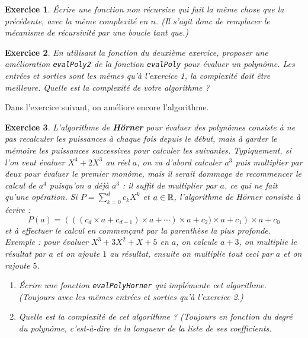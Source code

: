 \documentclass[11pt,a4paper]{article}
\newtheorem{ex}{Exercice}
\begin{document}
\begin{ex}
Écrire une fonction non récursive qui fait la même chose que la précédente, avec la même complexité en $n$. 
(Il s'agit donc de remplacer le mécanisme de récursivité par une boucle \og tant que\fg.)

\end{ex}

\begin{ex}
En utilisant la fonction du deuxième exercice, proposer une amélioration \verb+evalPoly2+ de la fonction \verb+evalPoly+ pour évaluer un polynôme.
Les entrées et sorties sont les mêmes qu'à l'exercice 1, la complexité doit être meilleure.
Quelle est la complexité de votre algorithme ?
\end{ex}

Dans l'exercice suivant, on améliore encore l'algorithme.

\begin{ex}
L'algorithme de \textbf{Hörner} pour évaluer des polynômes consiste à ne pas recalculer les puissances à chaque fois depuis le début, mais à garder le mémoire les puissances successives pour calculer les suivantes. 
Typiquement, si l'on veut évaluer $X^4+2X^3$ au réel $a$, on va d'abord calculer $a^3$ puis multiplier par deux pour évaluer le premier monôme, mais il serait dommage de recommencer le calcul de $a^4$ puisqu'on a déjà $a^3$ : il suffit de multiplier par $a$, ce qui ne fait qu'une opération.
Si $P = \sum_{k=0}^d c_kX^k$ et $a\in\mathbb{R}$, l'algorithme de Hörner consiste à écrire :
\[ P(a) = \left(((c_d\times a+c_{d-1})\times a +\cdots )\times a +c_2)\times a+c_1 \right)\times a+c_0\]
et à effectuer le calcul en commençant par la parenthèse la plus \og profonde\fg.
Exemple : pour évaluer $X^3+3X^2+X+5$ en $a$, on calcule $a+3$, on multiplie le résultat par $a$ et on ajoute $1$ au résultat, ensuite on multiplie tout ceci par $a$ et on rajoute $5$.

\begin{enumerate}
\item Écrire une fonction \verb+evalPolyHorner+ qui implémente cet algorithme. (Toujours avec les mêmes entrées et sorties qu'à l'exercice 2.)
\item Quelle est la complexité de cet algorithme ? (Toujours en fonction du degré du polynôme, c'est-à-dire de la longueur de la liste de ses coefficients.
\end{enumerate}

\end{ex}


\newpage
\end{document}
